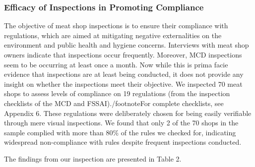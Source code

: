 \documentclass[a4paper, 12pt]{article}
\begin{document}
\subsubsection{Efficacy of Inspections in Promoting Compliance}

The objective of meat shop inspections is to ensure their compliance with regulations, which are aimed at mitigating negative externalities on the environment and public health and hygiene concerns. Interviews with meat shop owners indicate that inspections occur frequently. Moreover, MCD inspections seem to be occurring at least once a month. Now while this is prima facie evidence that inspections are at least being conducted, it does not provide any insight on whether the inspections meet their objective. We inspected 70 meat shops to assess levels of compliance on 19 regulations (from the inspection checklists of the MCD and FSSAI)./footnote{For complete checklists, see Appendix 6.} These regulations were deliberately chosen for being easily verifiable through mere visual inspections. We found that only 2 of the 70 shops in the sample complied with more than 80\% of the rules we checked for, indicating widespread non-compliance with rules despite frequent inspections conducted. 

The findings from our inspection are presented in Table 2. \\

\end{document}
